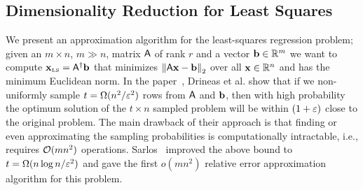 \subsection{Dimensionality Reduction for Least Squares}
We present an approximation algorithm for the least-squares regression problem; given an $m\times n$, $m\gg n$, matrix ${\mathsf{A} }$ of rank $r$ and a vector ${\mathbf b}\in\mathbb{R}^m$ we want to compute $\mathbf{x}_{\textrm{\tiny LS}}={{\mathsf{A} }}^\dagger{\mathbf b}$ that minimizes $\left\|{\mathsf{A} }\mathbf{x}-{\mathbf b}\right\|_2$ over all $\mathbf{x}\in\mathbb{R}^n$ and has the minimum Euclidean norm. In the paper~\cite{l2_regression:drineas06}, Drineas et al. show that if we non-uniformly sample $t=\Omega(n^2/\varepsilon^2)$ rows from ${\mathsf{A} }$ and ${\mathbf b}$, then with high probability the optimum solution of the $t\times n$ sampled problem will be within $(1+\varepsilon)$ close to the original problem. The main drawback of their approach is that finding or even approximating the sampling probabilities is computationally intractable, i.e., requires $\mathcal{O}(mn^2)$ operations. Sarlos~\cite{sarlos} improved the above bound to $t=\Omega( n\log n/\varepsilon^2)$ and gave the first $o(mn^2)$ relative error approximation algorithm for this problem.
%

